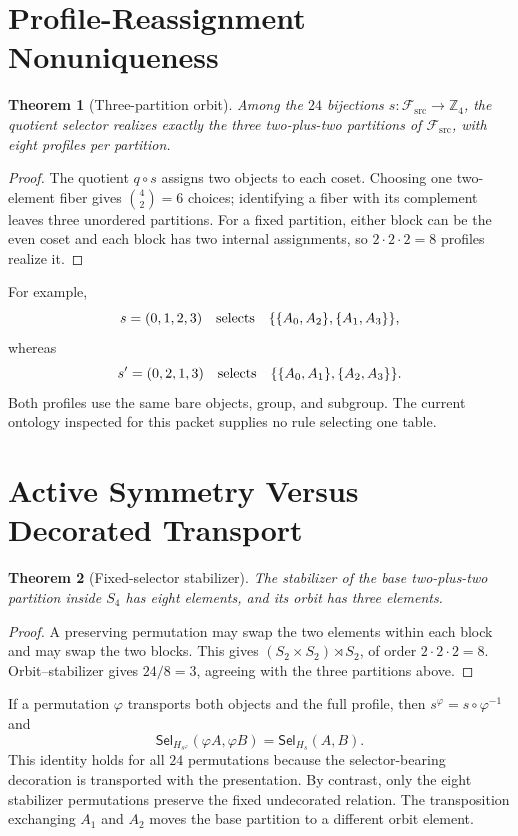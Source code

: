 \documentclass[11pt]{article}
\newtheorem{theorem}{Theorem}
\newcommand{\Fsrc}{\mathcal F_{\mathrm{src}}}
\newcommand{\Sel}{\mathsf{Sel}_{H}}
\begin{document}
\section{Profile-Reassignment Nonuniqueness}

\begin{theorem}[Three-partition orbit]
Among the \(24\) bijections \(s:\Fsrc\to\mathbb Z_4\), the quotient selector
realizes exactly the three two-plus-two partitions of \(\Fsrc\), with eight
profiles per partition.
\end{theorem}

\begin{proof}
The quotient \(q\circ s\) assigns two objects to each coset. Choosing one
two-element fiber gives \(\binom42=6\) choices; identifying a fiber with its
complement leaves three unordered partitions. For a fixed partition, either
block can be the even coset and each block has two internal assignments, so
\(2\cdot2\cdot2=8\) profiles realize it.
\end{proof}

For example,
\[
 s=(0,1,2,3)
 \quad\hbox{selects}\quad
 \{\{A_0,A_2\},\{A_1,A_3\}\},
\]
whereas
\[
 s'=(0,2,1,3)
 \quad\hbox{selects}\quad
 \{\{A_0,A_1\},\{A_2,A_3\}\}.
\]
Both profiles use the same bare objects, group, and subgroup. The current
ontology inspected for this packet supplies no rule selecting one table.

\section{Active Symmetry Versus Decorated Transport}

\begin{theorem}[Fixed-selector stabilizer]
The stabilizer of the base two-plus-two partition inside \(S_4\) has eight
elements, and its orbit has three elements.
\end{theorem}

\begin{proof}
A preserving permutation may swap the two elements within each block and may
swap the two blocks. This gives
\((S_2\times S_2)\rtimes S_2\), of order \(2\cdot2\cdot2=8\).
Orbit--stabilizer gives \(24/8=3\), agreeing with the three partitions above.
\end{proof}

If a permutation \(\varphi\) transports both objects and the full profile,
then \(s^\varphi=s\circ\varphi^{-1}\) and
\[
 \Sel_{s^\varphi}(\varphi A,\varphi B)=\Sel_s(A,B).
\]
This identity holds for all \(24\) permutations because the selector-bearing
decoration is transported with the presentation. By contrast, only the eight
stabilizer permutations preserve the fixed undecorated relation. The
transposition exchanging \(A_1\) and \(A_2\) moves the base partition to a
different orbit element.
\end{document}
